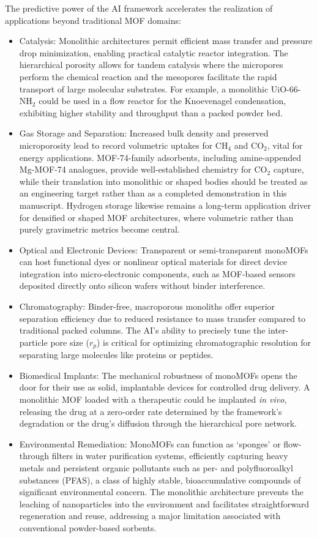 \documentclass[12pt,a4paper]{article}
\begin{document}
The predictive power of the AI framework accelerates the realization of applications beyond traditional MOF domains:\cite{ref43}
\begin{itemize}
    \item Catalysis: Monolithic architectures permit efficient mass transfer and pressure drop minimization, enabling practical catalytic reactor integration. The hierarchical porosity allows for tandem catalysis where the micropores perform the chemical reaction and the mesopores facilitate the rapid transport of large molecular substrates. For example, a monolithic UiO-66-NH$_2$ could be used in a flow reactor for the Knoevenagel condensation, exhibiting higher stability and throughput than a packed powder bed.
    \item Gas Storage and Separation: Increased bulk density and preserved microporosity lead to record volumetric uptakes for $\text{CH}_4$ and $\text{CO}_2$, vital for energy applications.\cite{ref4} MOF-74-family adsorbents, including amine-appended Mg-MOF-74 analogues, provide well-established chemistry for $\text{CO}_2$ capture, while their translation into monolithic or shaped bodies should be treated as an engineering target rather than as a completed demonstration in this manuscript.\cite{ref44} Hydrogen storage likewise remains a long-term application driver for densified or shaped MOF architectures, where volumetric rather than purely gravimetric metrics become central.\cite{ref45}
    \item Optical and Electronic Devices: Transparent or semi-transparent monoMOFs can host functional dyes or nonlinear optical materials for direct device integration into micro-electronic components, such as MOF-based sensors deposited directly onto silicon wafers without binder interference.
    \item Chromatography: Binder-free, macroporous monoliths offer superior separation efficiency due to reduced resistance to mass transfer compared to traditional packed columns. The AI's ability to precisely tune the inter-particle pore size ($r_p$) is critical for optimizing chromatographic resolution for separating large molecules like proteins or peptides.
    \item Biomedical Implants: The mechanical robustness of monoMOFs opens the door for their use as solid, implantable devices for controlled drug delivery. A monolithic MOF loaded with a therapeutic could be implanted \textit{in vivo}, releasing the drug at a zero-order rate determined by the framework's degradation or the drug's diffusion through the hierarchical pore network.
    \item Environmental Remediation: MonoMOFs can function as `sponges' or flow-through filters in water purification systems, efficiently capturing heavy metals and persistent organic pollutants such as per- and polyfluoroalkyl substances (PFAS), a class of highly stable, bioaccumulative compounds of significant environmental concern. The monolithic architecture prevents the leaching of nanoparticles into the environment and facilitates straightforward regeneration and reuse, addressing a major limitation associated with conventional powder-based sorbents.

\end{itemize}
\end{document}
